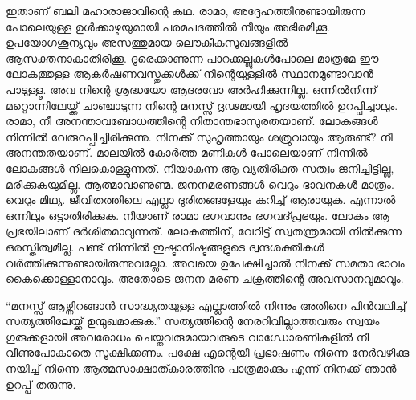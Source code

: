 ഇതാണ് ബലി മഹാരാജാവിന്റെ കഥ. രാമാ, അദ്ദേഹത്തിനുണ്ടായിരുന്ന പോലെയുള്ള ഉള്‍ക്കാഴ്ചയുമായി പരമപദത്തില്‍ നീയും അഭിരമിക്കൂ. ഉപയോഗശൂന്യവും അസത്തുമായ ലൌകീകസുഖങ്ങളില്‍ ആസക്തനാകാതിരിക്കൂ. ദൂരെക്കാണുന്ന പാറക്കല്ലുകള്‍പോലെ മാത്രമേ ഈ ലോകത്തുള്ള ആകര്‍ഷണവസ്തുക്കള്‍ക്ക് നിന്റെയുള്ളില്‍ സ്ഥാനമുണ്ടാവാന്‍ പാടുള്ളൂ. അവ നിന്റെ ശ്രദ്ധയോ ആദരവോ അര്‍ഹിക്കുന്നില്ല. ഒന്നില്‍നിന്ന് മറ്റൊന്നിലേയ്ക്ക് ചാഞ്ചാടുന്ന നിന്റെ മനസ്സ് ദൃഢമായി ഹൃദയത്തില്‍ ഉറപ്പിച്ചാലും. രാമാ, നീ അനന്താവബോധത്തിന്റെ നിതാന്തഭാസുരതയാണ്. ലോകങ്ങള്‍ നിന്നില്‍ വേരുറപ്പിച്ചിരിക്കുന്നു. നിനക്ക് സുഹൃത്തായും  ശത്രുവായും ആരുണ്ട്? നീ അനന്തതയാണ്. മാലയില്‍ കോര്‍ത്ത മണികള്‍ പോലെയാണ് നിന്നില്‍ ലോകങ്ങള്‍ നിലകൊള്ളുന്നത്. നീയാകുന്ന ആ വ്യതിരിക്ത സത്വം ജനിച്ചിട്ടില്ല, മരിക്കുകയുമില്ല. ആത്മാവാണുണ്മ. ജനനമരണങ്ങള്‍ വെറും ഭാവനകള്‍ മാത്രം. വെറും മിഥ്യ. ജീവിതത്തിലെ എല്ലാ ദുരിതങ്ങളേയും കുറിച്ച് ആരായുക. എന്നാല്‍ ഒന്നിലും ഒട്ടാതിരിക്കുക. നീയാണ് രാമാ ഭഗവാനും ഭഗവദ്പ്രഭയും. ലോകം ആ പ്രഭയിലാണ് ദര്‍ശിതമാവുന്നത്. ലോകത്തിന്, വേറിട്ട്  സ്വതന്ത്രമായി നില്‍ക്കുന്ന  ഒരസ്തിത്വമില്ല. പണ്ട് നിന്നില്‍ ഇഷ്ടാനിഷ്ടങ്ങളുടെ ദ്വന്ദശക്തികള്‍ വര്‍ത്തിക്കുന്നുണ്ടായിരുന്നുവല്ലോ. അവയെ ഉപേക്ഷിച്ചാല്‍ നിനക്ക് സമതാ ഭാവം കൈക്കൊള്ളാനാവും. അതോടെ ജനന മരണ ചക്രത്തിന്റെ അവസാനവുമാവും.

“മനസ്സ് ആഴ്ന്നിറങ്ങാന്‍ സാദ്ധ്യതയുള്ള എല്ലാത്തില്‍ നിന്നും അതിനെ പിന്‍വലിച്ച് സത്യത്തിലേയ്ക്ക് ഉന്മുഖമാക്കുക.” സത്യത്തിന്റെ നേരറിവില്ലാത്തവരും സ്വയം ഗുരുക്കളായി അവരോധം ചെയ്തവരുമായവരുടെ വാഗ്ധോരണികളില്‍ നീ വീണുപോകാതെ സൂക്ഷിക്കണം. പക്ഷേ എന്റെയീ പ്രഭാഷണം നിന്നെ നേര്‍വഴിക്കു നയിച്ച് നിന്നെ ആത്മസാക്ഷാത്കാരത്തിനു പാത്രമാക്കും എന്ന് നിനക്ക് ഞാന്‍ ഉറപ്പ് തരുന്നു.

